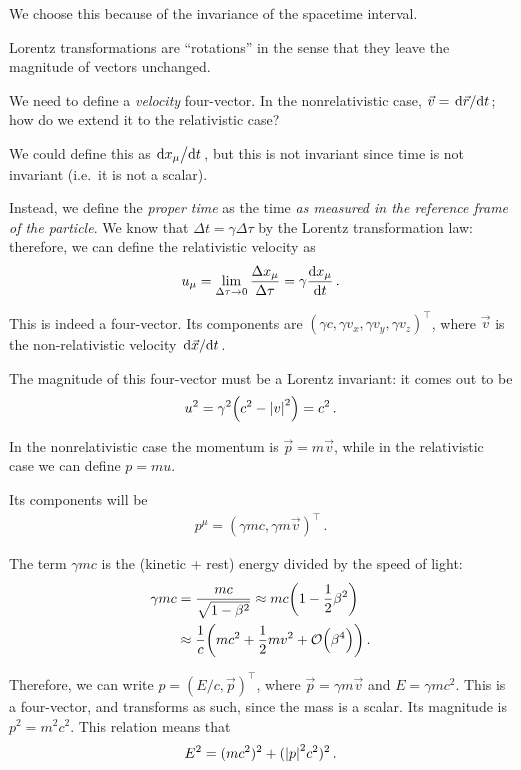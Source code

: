 \documentclass[main.tex]{subfiles}
\begin{document}
We choose this because of the invariance of the spacetime interval. 

Lorentz transformations are ``rotations'' in the sense that they leave the magnitude of vectors unchanged. 

We need to define a \emph{velocity} four-vector.
In the nonrelativistic case, \(\vec{v} = \dv*{\vec{r}}{t}\); how do we extend it to the relativistic case?

We could define this as \(\dv*{x_{\mu }}{t}\), but this is not invariant since time is not invariant (i.e.\ it is not a scalar).

Instead, we define the \emph{proper time} as the time \emph{as measured in the reference frame of the particle}. 
We know that \(\Delta t = \gamma \Delta \tau \) by the Lorentz transformation law: therefore, we can define the relativistic velocity as
%
\begin{align}
u_{\mu } = \lim_{ \Delta \tau \to 0} \frac{ \Delta x_{\mu }}{\Delta \tau } = \gamma \dv{x_{\mu }}{t}
\,.
\end{align}

This is indeed a four-vector.
Its components are \((\gamma c, \gamma v_x, \gamma v_y, \gamma v_z)^{\top}\), where \(\vec{v}\) is the non-relativistic velocity \(\dv*{\vec{x}}{t}\). 

The magnitude of this four-vector must be a Lorentz invariant: it comes out to be 
%
\begin{align}
u^2 = \gamma^2 \qty(c^2 - \abs{v}^2) = c^2
\,.
\end{align}

In the nonrelativistic case the momentum is \(\vec{p} = m \vec{v}\), while in the relativistic case we can define \(p = m u\). 

Its components will be 
%
\begin{align}
p^{\mu } = (\gamma m c, \gamma m \vec{v})^{\top}
\,.
\end{align}

The term \(\gamma mc\) is the (kinetic + rest) energy divided by the speed of light: 
%
\begin{align}
\gamma mc &= \frac{mc}{\sqrt{1 - \beta^2}} \approx mc \qty(1 - \frac{1}{2} \beta^2)  \\
&\approx \frac{1}{c} \qty(mc^2 + \frac{1}{2} mv^2 + \order{\beta ^{4}})
\,.
\end{align}

Therefore, we can write \(p = (E/c, \vec{p})^{\top}\), where \(\vec{p} = \gamma m \vec{v}\) and \(E = \gamma m c^2\). 
This is a four-vector, and transforms as such, since the mass is a scalar. 
Its magnitude is \(p^2 = m^2 c^2\). 
This relation means that 
%
\begin{align}
E^2 = (mc^2)^2 + (\abs{p}^2 c^2)^2
\,.
\end{align}
\end{document}
